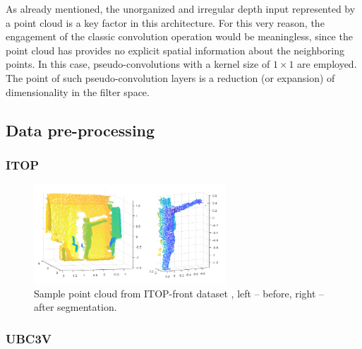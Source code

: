 \noindent
As already mentioned, the unorganized and irregular depth input represented by a point cloud is a key factor in this architecture. For this very reason, the engagement of the classic convolution operation would be meaningless, since the point cloud has provides no explicit spatial information about the neighboring points. In this case, pseudo-convolutions with a kernel size of $1\times1$ are employed. The point of such pseudo-convolution layers is a reduction (or expansion) of dimensionality in the filter space. %





\subsection{Data pre-processing}

\subsubsection{ITOP}


\begin{figure}[H]
\begin{center}
  \includegraphics[height=140px]{images/implementation/itop_seg.png}
  \caption[Sample point cloud from ITOP-front dataset \cite{haque2016viewpoint}.]{ Sample point cloud from ITOP-front dataset \cite{haque2016viewpoint}, left – before, right – after segmentation.}
  \label{fig:itop_seg}
\end{center}
\end{figure}

\subsubsection{UBC3V}

